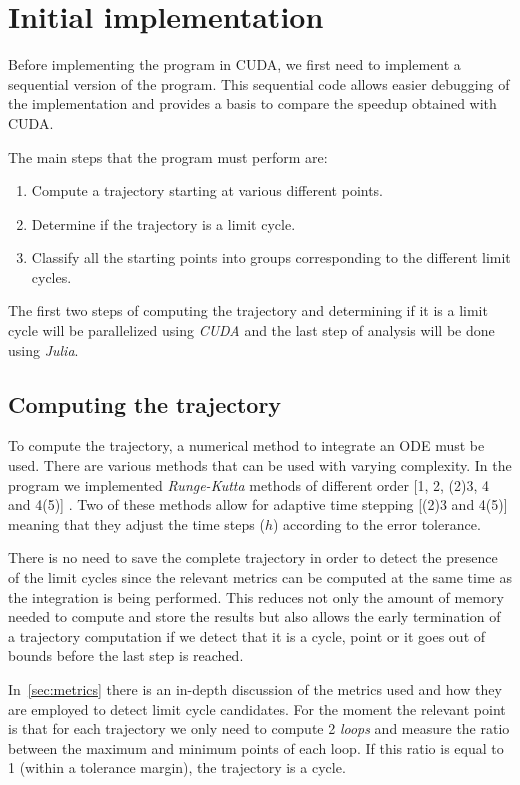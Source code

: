 \pagebreak
\section{Initial implementation}%
\label{sec:initial_implementation}

Before implementing the program in CUDA, we first need to implement a sequential version of the program. This sequential code allows easier debugging of the implementation and provides a basis to compare the speedup obtained with CUDA.

The main steps that the program must perform are:

\begin{enumerate}
    \item Compute a trajectory starting at various different points.
    \item Determine if the trajectory is a limit cycle.
    \item Classify all the starting points into groups corresponding to
        the different limit cycles.
\end{enumerate}

The first two steps of computing the trajectory and determining if it is a limit cycle will be parallelized using \emph{CUDA} and the last step of analysis will be done using \emph{Julia}.

\subsection{Computing the trajectory}

To compute the trajectory, a numerical method to integrate an ODE must be used. There are various methods that can be used with varying complexity. In the program we implemented \emph{Runge-Kutta} methods of different order [1, 2, (2)3, 4 and 4(5)] \cite{butcher_numerical_2008}. Two of these methods allow for adaptive time stepping [(2)3 and 4(5)] meaning that they adjust the time steps ($h$) according to the error tolerance.

There is no need to save the complete trajectory in order to detect the presence of the limit cycles since the relevant metrics can be computed at the same time as the integration is being performed. This reduces not only the amount of memory needed to compute and store the results but also allows the early termination of a trajectory computation if we detect that it is a cycle, point or it goes out of bounds before the last step is reached.

In~\cref{sec:metrics} there is an in-depth discussion of the metrics used and
how they are employed to detect limit cycle candidates. For the moment the relevant
point is that for each trajectory we only need to compute 2 \emph{loops} and
measure the ratio between the maximum and minimum points of each loop. If this
ratio is equal to 1 (within a tolerance margin), the trajectory is a cycle.

